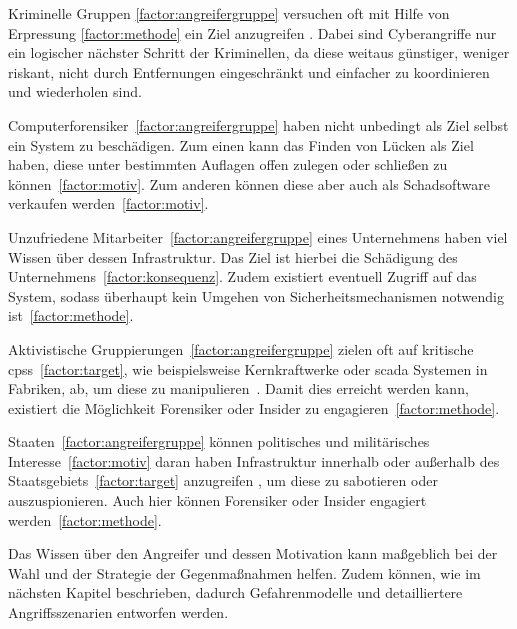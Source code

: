 \documentclass[final,bibliography=totocnumbered]{include/sikseminar}
\newcommand{\cps}{\glspl{cps}\xspace}
\begin{document}
Kriminelle Gruppen \ref{factor:angreifergruppe} versuchen oft mit Hilfe von Erpressung \ref{factor:methode} ein Ziel anzugreifen \cite{WYX+10}.
Dabei sind Cyberangriffe nur ein logischer nächster Schritt der Kriminellen, da diese weitaus günstiger, weniger riskant, nicht durch Entfernungen eingeschränkt und einfacher zu koordinieren und wiederholen sind. \cite{CAS+09}

Computerforensiker~\ref{factor:angreifergruppe} haben nicht unbedingt als Ziel selbst ein System zu beschädigen.
Zum einen kann das Finden von Lücken als Ziel haben, diese unter bestimmten Auflagen offen zulegen oder schließen zu können~\ref{factor:motiv}. 
Zum anderen können diese aber auch als Schadsoftware verkaufen werden~\ref{factor:motiv}. 

Unzufriedene Mitarbeiter~\ref{factor:angreifergruppe} eines Unternehmens haben viel Wissen über dessen Infrastruktur.
Das Ziel ist hierbei die Schädigung des Unternehmens~\ref{factor:konsequenz}.
Zudem existiert eventuell Zugriff auf das System, sodass überhaupt kein Umgehen von Sicherheitsmechanismen notwendig ist~\ref{factor:methode}.~\cite{CAS+09,WYX+10}

Aktivistische Gruppierungen~\ref{factor:angreifergruppe} zielen oft auf kritische \cps~\ref{factor:target}, wie beispielsweise Kernkraftwerke oder \gls{scada} Systemen in Fabriken, ab, um diese zu manipulieren~\cite{CAS+09,HLL+17}. 
Damit dies erreicht werden kann, existiert die Möglichkeit Forensiker oder Insider zu engagieren~\ref{factor:methode}.~\cite{WYX+10}

Staaten~\ref{factor:angreifergruppe} können politisches und militärisches Interesse~\ref{factor:motiv} daran haben Infrastruktur innerhalb oder außerhalb des Staatsgebiets~\ref{factor:target} anzugreifen \cite{CAS+09}, um diese zu sabotieren oder auszuspionieren.
Auch hier können Forensiker oder Insider engagiert werden~\ref{factor:methode}.

Das Wissen über den Angreifer und dessen Motivation kann maßgeblich bei der Wahl und der Strategie der Gegenmaßnahmen helfen.
Zudem können, wie im nächsten Kapitel beschrieben, dadurch Gefahrenmodelle und detailliertere Angriffsszenarien entworfen werden.
\end{document}
